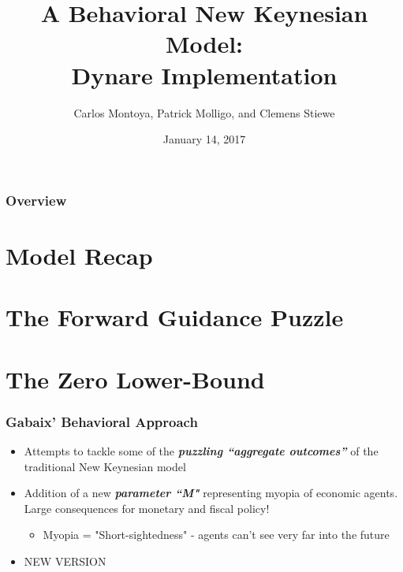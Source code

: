 \documentclass{beamer}
\title[A Behavioral New Keynesian Model]{A Behavioral New Keynesian Model: \\Dynare Implementation} %
\author[Current Research in Macroeconomics]{Carlos Montoya, Patrick Molligo, and Clemens Stiewe } %
\institute[] %
{
\\Current Research in Macroeconomics%
\medskip
\textit{} %
}
\date{January 14, 2017} %
\begin{document}
	
\begin{frame}
	\titlepage %
\end{frame}


\begin{frame}
	\frametitle{Overview} %
	\tableofcontents %
\end{frame}


\section{Model Recap} %
\section{The Forward Guidance Puzzle}
\section{The Zero Lower-Bound}


\begin{frame}
	\frametitle{Gabaix' Behavioral Approach}
	\begin{itemize}
		\item Attempts to tackle some of the \textit{\textbf{puzzling ``aggregate outcomes''}} of the traditional New Keynesian model
		\vspace{8pt}
		\item Addition of a new \textit{\textbf{parameter ``M"}} representing myopia of economic agents. Large consequences for monetary and fiscal policy!
		\vspace{8pt}
		\begin{itemize}
			\item Myopia = "Short-sightedness" - agents can't see very far into the future
		\end{itemize}
		\item NEW VERSION
	\end{itemize}
\end{frame}
\end{document}
